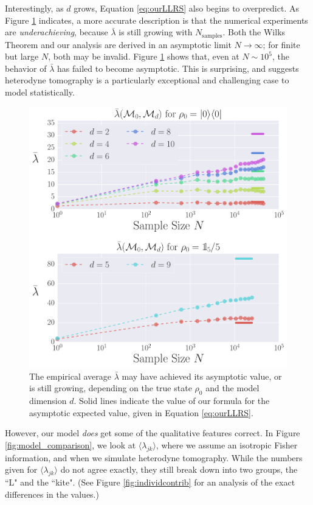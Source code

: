 \documentclass[aps,pra, twocolumn]{revtex4-1}
\begin{document}
Interestingly, as $d$ grows, Equation \eqref{eq:ourLLRS} also begins to overpredict. As Figure \ref{fig:totalcontrib} indicates, a more accurate description is that the numerical experiments are \emph{underachieving}, because $\bar\lambda$ is still growing with $N_{\mathrm{samples}}$.  Both the Wilks Theorem and our analysis are derived in an asymptotic limit $N \rightarrow \infty$; for finite but large $N$, both may be invalid.  Figure \ref{fig:totalcontrib} shows that, even at $N\sim 10^{5}$, the behavior of $\bar{\lambda}$ has failed to become asymptotic. This is surprising, and suggests heterodyne tomography is a particularly exceptional and challenging case to model statistically. 

\begin{figure}[h]
  \includegraphics[width=\columnwidth]{Images/Figure_8.pdf}
 \caption{The empirical average $\bar{\lambda}$  may have achieved its asymptotic value, or is still 
growing, depending on the true state $\rho_{0}$ and the model dimension $d$. Solid lines indicate the value of our formula
for the asymptotic expected value, given in Equation \eqref{eq:ourLLRS}.}
\label{fig:totalcontrib}
\end{figure}


However, our model \emph{does} get some of the qualitative features correct. In Figure \ref{fig:model_comparison}, we look at $\langle \lambda_{jk}\rangle$, where we assume an isotropic Fisher information, and when we simulate heterodyne tomography. While the numbers given for $\langle \lambda_{jk} \rangle$ do not agree exactly, they still break down into two groups, the ``L" and the ``kite". (See Figure \ref{fig:individcontrib} for an analysis of the exact differences in the values.)
 
\end{document}
